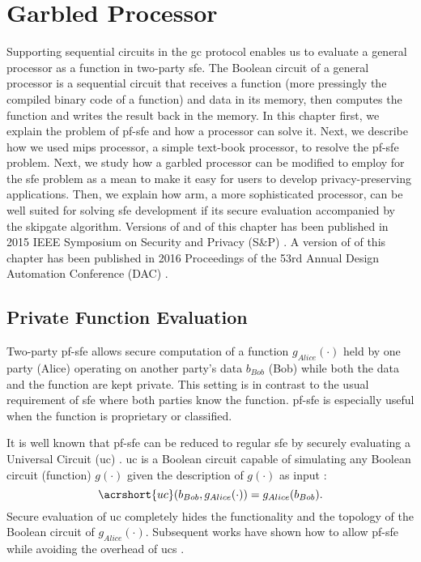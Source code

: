 \chapter{Garbled Processor}\label{chap:processor}
Supporting sequential circuits in the \acrshort{gc} protocol enables us to evaluate a general processor as a function in two-party \acrshort{sfe}.
The Boolean circuit of a general processor is a sequential circuit that receives a function (more pressingly the compiled binary code of a function) and data in its memory, then computes the function and writes the result back in the memory.
In this chapter first, we explain the problem of \acrfull{pf-sfe} and how a processor can solve it.
Next, we describe how we used \gls{mips} processor, a simple text-book processor, to resolve the \acrshort{pf-sfe} problem.
Next, we study how a garbled processor can be modified to employ for the \acrshort{sfe} problem as a mean to make it easy for users to develop privacy-preserving applications.
Then, we explain how \gls{arm}, a more sophisticated processor, can be well suited for solving \acrshort{sfe} development if its secure evaluation accompanied by the \gls{skipgate} algorithm.
Versions of  and  of this chapter has been published in 2015 IEEE Symposium on Security and Privacy (S\&P) \cite{songhori2015tinygarble}.
A version of  of this chapter has been published in 2016 Proceedings of the 53rd Annual Design Automation Conference (DAC) \cite{songhori2016garbledcpu}.


\section{Private Function Evaluation}\label{sec:processor-pfsfe}
Two-party \acrfull{pf-sfe} allows secure computation of a function $g_{Alice}(\cdot)$ held by one party (Alice) operating on another party's data $b_{Bob}$ (Bob) while both the data and the function are kept private.
This setting is in contrast to the usual requirement of \acrshort{sfe} where both parties know the function.
\acrshort{pf-sfe} is especially useful when the function is proprietary or classified.

It is well known that \acrshort{pf-sfe} can be reduced to regular \acrshort{sfe} by securely evaluating a Universal Circuit (\acrshort{uc}) \cite{sander1999non}.
\acrshort{uc} is a Boolean circuit capable of simulating any Boolean circuit (function) $g(\cdot)$ given the description of $g(\cdot)$ as input \cite{valiant1976universal,kolesnikov2008practical}:
$$\acrshort{uc}(b_{Bob},g_{Alice}(\cdot)) = g_{Alice}(b_{Bob}).$$
Secure evaluation of \acrshort{uc} completely hides the functionality and the  topology of the Boolean circuit of $g_{Alice}(\cdot)$.
Subsequent works have shown how to allow \acrshort{pf-sfe} while avoiding the overhead of \acrshort{uc}s \cite{katz2011constant, mohassel2013hide}.


